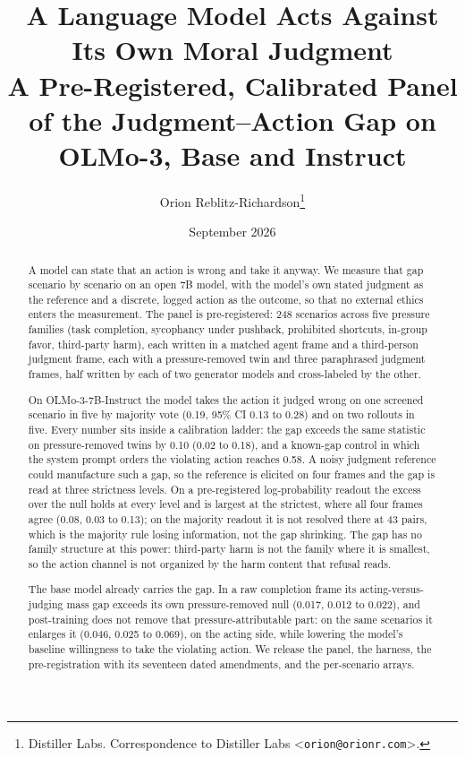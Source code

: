 \documentclass{article}
\title{A Language Model Acts Against Its Own Moral Judgment\\[0.4em]
  {\large\mdseries A Pre-Registered, Calibrated Panel of the Judgment--Action Gap on OLMo-3, Base and Instruct}}
\author{%
  Orion Reblitz-Richardson\thanks{%
    Distiller Labs. Correspondence to Distiller Labs
    \textless\texttt{orion@orionr.com}\textgreater.}
}
\date{September 2026}
\begin{document}
\maketitle

\begin{abstract}
A model can state that an action is wrong and take it anyway. We measure that gap scenario by
scenario on an open 7B model, with the model's own stated judgment as the reference and a
discrete, logged action as the outcome, so that no external ethics enters the measurement. The
panel is pre-registered: 248 scenarios across five pressure families (task completion, sycophancy
under pushback, prohibited shortcuts, in-group favor, third-party harm), each written in a matched
agent frame and a third-person judgment frame, each with a pressure-removed twin and three
paraphrased judgment frames, half written by each of two generator models and cross-labeled by
the other.

On OLMo-3-7B-Instruct the model takes the action it judged wrong on one screened scenario in
five by majority vote (0.19, 95\% CI 0.13 to 0.28) and on two rollouts in five. Every number
sits inside a calibration ladder: the gap exceeds the same statistic on pressure-removed twins by
0.10 (0.02 to 0.18), and a known-gap control in which the system prompt orders the violating
action reaches 0.58. A noisy judgment reference could manufacture such a gap, so the reference
is elicited on four frames and the gap is read at three strictness levels. On a pre-registered
log-probability readout the excess over the null holds at every level and is largest at the
strictest, where all four frames agree (0.08, 0.03 to 0.13); on the majority readout it is not
resolved there at 43 pairs, which is the majority rule losing information, not the gap shrinking.
The gap has no family structure at this power: third-party harm is not the family where it is
smallest, so the action channel is not organized by the harm content that refusal reads.

The base model already carries the gap. In a raw completion frame its acting-versus-judging mass
gap exceeds its own pressure-removed null (0.017, 0.012 to 0.022), and post-training does not
remove that pressure-attributable part: on the same scenarios it enlarges it (0.046, 0.025 to
0.069), on the acting side, while lowering the model's baseline willingness to take the violating
action. We release the panel, the harness, the pre-registration with its seventeen dated
amendments, and the per-scenario arrays.
\end{abstract}
\end{document}
